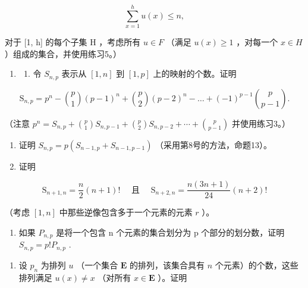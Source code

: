 \[
\sum_ {x = 1} ^ {h} u (x) \leqslant n,
\]

对于 {[}1, h{]} 的每个子集 H ，考虑所有 \(u \in F\) （满足 \(u(x) \geqslant 1\) ，对每一个 \(x \in H\) ）组成的集合，并使用练习5。）

\begin{enumerate}
\def\labelenumi{\arabic{enumi}.}
\setcounter{enumi}{6}
\tightlist
\item
  \begin{enumerate}
  \def\labelenumii{(\alph{enumii})}
  \tightlist
  \item
    令 \(S_{n,p}\) 表示从 \([1, n]\) 到 \([1, p]\) 上的映射的个数。证明
  \end{enumerate}
\end{enumerate}

\[
\mathrm{S} _ {n, p} = p ^ {n} - \binom {p} {1} (p - 1) ^ {n} + \binom {p} {2} (p - 2) ^ {n} - \dots + (- 1) ^ {p - 1} \binom {p} {p - 1}.
\]

（注意 \(p^{n} = S_{n,p} + \binom{p}{1} S_{n,p-1} + \binom{p}{2} S_{n,p-2} + \cdots + \binom{p}{p-1}\) 并使用练习3。）

\begin{enumerate}
\def\labelenumi{(\alph{enumi})}
\setcounter{enumi}{1}
\item
  证明 \(S_{n,p} = p(S_{n-1,p} + S_{n-1,p-1})\) （采用第8号的方法，命题13）。
\item
  证明
\end{enumerate}

\[
\mathrm{S} _ {n + 1, n} = \frac {n}{2} (n + 1)! \quad \text { 且 } \quad \mathrm{S} _ {n + 2, n} = \frac {n (3 n + 1)}{2 4} (n + 2)!
\]

（考虑 \([1, n]\) 中那些逆像包含多于一个元素的元素 \(r\) ）。

\begin{enumerate}
\def\labelenumi{(\alph{enumi})}
\setcounter{enumi}{3}
\tightlist
\item
  如果 \(P_{n,p}\) 是将一个包含 n 个元素的集合划分为 p 个部分的划分数，证明 \(S_{n,p} = p!P_{n,p}\) .
\end{enumerate}

\begin{enumerate}
\def\labelenumi{\arabic{enumi}.}
\setcounter{enumi}{7}
\tightlist
\item
  设 \(p_n\) 为排列 \(u\) （一个集合 \(\mathbf{E}\) 的排列，该集合具有 \(n\) 个元素）的个数，这些排列满足 \(u(x) \neq x\) （对所有 \(x \in \mathbf{E}\) ）。证明
\end{enumerate}

